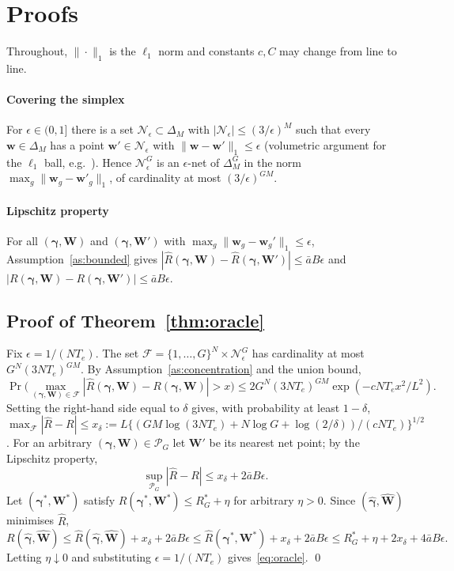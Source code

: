 \section{Proofs}\label{app:proofs}

Throughout, $\|\cdot\|_1$ is the $\ell_1$ norm and constants $c,C$ may change from line to line.

\paragraph{Covering the simplex}
For $\epsilon\in(0,1]$ there is a set $\mathcal N_\epsilon\subset\Delta_M$ with $|\mathcal N_\epsilon|\le(3/\epsilon)^M$ such that every $\bm w\in\Delta_M$ has a point $\bm w'\in\mathcal N_\epsilon$ with $\|\bm w-\bm w'\|_1\le\epsilon$ (volumetric argument for the $\ell_1$ ball, e.g.\ \citealp[Ch.~4]{Vershynin2018}).
Hence $\mathcal N_\epsilon^G$ is an $\epsilon$-net of $\Delta_M^G$ in the norm $\max_g\|\bm w_g-\bm w'_g\|_1$, of cardinality at most $(3/\epsilon)^{GM}$.

\paragraph{Lipschitz property}
For all $(\bm\gamma,\bm W)$ and $(\bm\gamma,\bm W')$ with $\max_g\|\bm w_g-\bm w_g'\|_1\le\epsilon$, Assumption~\ref{as:bounded} gives
$|\widehat R(\bm\gamma,\bm W)-\widehat R(\bm\gamma,\bm W')|\le\bar aB\epsilon$ and $|R(\bm\gamma,\bm W)-R(\bm\gamma,\bm W')|\le\bar aB\epsilon$.

\subsection*{Proof of Theorem~\ref{thm:oracle}}

Fix $\epsilon=1/(NT_e)$.
The set $\mathcal F=\{1,\dots,G\}^N\times\mathcal N_\epsilon^G$ has cardinality at most $G^N(3NT_e)^{GM}$.
By Assumption~\ref{as:concentration} and the union bound,
\[
\Pr\Big(\max_{(\bm\gamma,\bm W)\in\mathcal F}|\widehat R(\bm\gamma,\bm W)-R(\bm\gamma,\bm W)|>x\Big)\le 2G^N(3NT_e)^{GM}\exp(-cNT_ex^2/L^2).
\]
Setting the right-hand side equal to $\delta$ gives, with probability at least $1-\delta$,
$\max_{\mathcal F}|\widehat R-R|\le x_\delta:=L\{(GM\log(3NT_e)+N\log G+\log(2/\delta))/(cNT_e)\}^{1/2}$.
For an arbitrary $(\bm\gamma,\bm W)\in\mathcal P_G$ let $\bm W'$ be its nearest net point; by the Lipschitz property,
\[
\sup_{\mathcal P_G}|\widehat R-R|\le x_\delta+2\bar aB\epsilon .
\]
Let $(\bm\gamma^*,\bm W^*)$ satisfy $R(\bm\gamma^*,\bm W^*)\le R^*_G+\eta$ for arbitrary $\eta>0$.
Since $(\widehat{\bm\gamma},\widehat{\bm W})$ minimises $\widehat R$,
\[
R(\widehat{\bm\gamma},\widehat{\bm W})\le\widehat R(\widehat{\bm\gamma},\widehat{\bm W})+x_\delta+2\bar aB\epsilon
\le\widehat R(\bm\gamma^*,\bm W^*)+x_\delta+2\bar aB\epsilon\le R^*_G+\eta+2x_\delta+4\bar aB\epsilon .
\]
Letting $\eta\downarrow0$ and substituting $\epsilon=1/(NT_e)$ gives~\eqref{eq:oracle}. \qed

